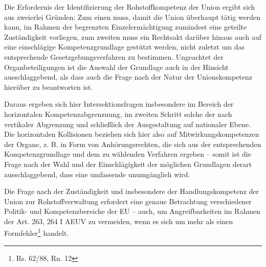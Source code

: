 \documentclass[12pt,a4paper,oneside]{book} %
\begin{document}
	Die Erfordernis der Identifizierung der Rohstoffkompetenz der Union ergibt sich aus zweierlei Gründen: Zum einen muss, damit die Union überhaupt tätig werden kann, im Rahmen der begrenzten Einzelermächtigung zumindest eine geteilte Zuständigkeit vorliegen, zum zweiten muss ein Rechtsakt darüber hinaus auch auf eine einschlägige Kompetenzgrundlage gestützt werden, nicht zuletzt um das entsprechende Gesetzgebungsverfahren zu bestimmen. Ungeachtet der Organbeteiligungen ist die Auswahl der Grundlage auch in der Hinsicht ausschlaggebend, als dass auch die Frage nach der Natur der Unionskompetenz hierüber zu beantworten ist.
	
	Daraus ergeben sich hier Intersektionsfragen insbesondere im Bereich der horizontalen Kompetenzabgrenzuung, im zweiten Schritt solche der nach vertikaler Abgrenzung und schließlich der Ausgestaltung auf nationaler Ebene. Die horizontalen Kollisionen beziehen sich hier also auf Mitwirkungskompetenzen der Organe, z. B. in Form von Anhörungsrechten, die sich aus der entsprechenden Kompetenzgrundlage und dem zu wählenden Verfahren ergeben -- somit ist die Frage nach der Wahl und der Einschlägigkeit der möglichen Grundlagen derart ausschlaggebend, dass eine umfassende unumgänglich wird.
	
	Die Frage nach der Zuständigkeit und insbesondere der Handlungskompetenz der Union zur Rohstoffverwaltung erfordert eine genaue Betrachtung verschiedener Politik- und Kompetenzbereiche der EU -- auch, um Angreifbarkeiten im Rahmen der Art. 263, 264 I AEUV zu vermeiden, wenn es sich um mehr als einen \glqq Formfehler\grqq\footnote{Rs. 62/88, Rn. 12} handelt.
	
\end{document}
